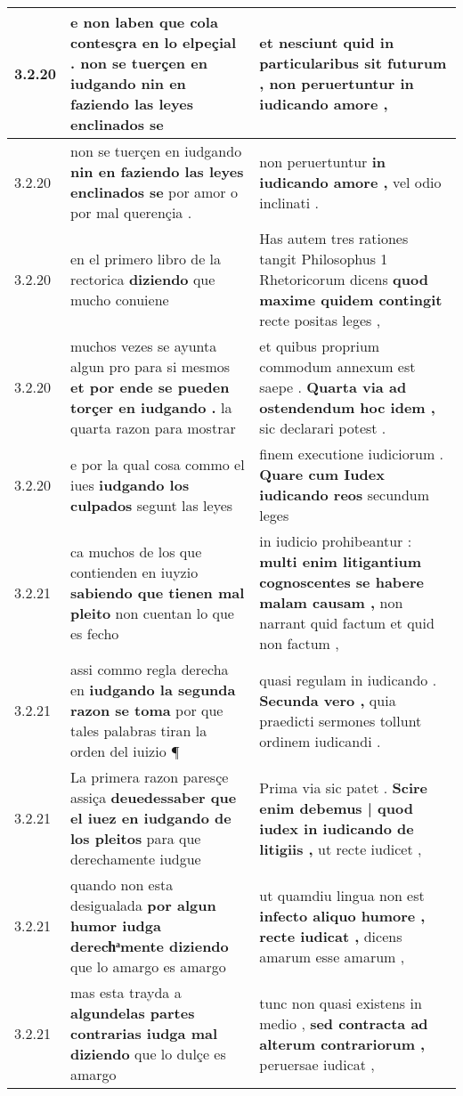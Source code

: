 \begin{tabular}{|p{1cm}|p{6.5cm}|p{6.5cm}|}
3.2.20 & e non laben que cola contesçra en lo elpeçial . \textbf{ non se tuerçen en iudgando } nin en faziendo las leyes enclinados se & et nesciunt quid in particularibus sit futurum , \textbf{ non peruertuntur } in iudicando amore , \\\hline
3.2.20 & non se tuerçen en iudgando \textbf{ nin en faziendo las leyes enclinados se } por amor o por mal querençia . & non peruertuntur \textbf{ in iudicando amore , } vel odio inclinati . \\\hline
3.2.20 & en el primero libro de la rectorica \textbf{ diziendo } que mucho conuiene & Has autem tres rationes tangit Philosophus 1 Rhetoricorum dicens \textbf{ quod maxime quidem contingit } recte positas leges , \\\hline
3.2.20 & muchos vezes se ayunta algun pro para si mesmos \textbf{ et por ende se pueden torçer en iudgando . } la quarta razon para mostrar & et quibus proprium commodum annexum est saepe . \textbf{ Quarta via ad ostendendum hoc idem , } sic declarari potest . \\\hline
3.2.20 & e por la qual cosa commo el iues \textbf{ iudgando los culpados } segunt las leyes & finem executione iudiciorum . \textbf{ Quare cum Iudex iudicando reos } secundum leges \\\hline
3.2.21 & ca muchos de los que contienden en iuyzio \textbf{ sabiendo que tienen mal pleito } non cuentan lo que es fecho & in iudicio prohibeantur : \textbf{ multi enim litigantium cognoscentes se habere malam causam , } non narrant quid factum et quid non factum , \\\hline
3.2.21 & assi commo regla derecha en \textbf{ iudgando la segunda razon se toma } por que tales palabras tiran la orden del iuizio ¶ & quasi regulam in iudicando . \textbf{ Secunda vero , } quia praedicti sermones tollunt ordinem iudicandi . \\\hline
3.2.21 & La primera razon paresçe assiça \textbf{ deuedessaber que el iuez en iudgando de los pleitos } para que derechamente iudgue & Prima via sic patet . \textbf{ Scire enim debemus | quod iudex in iudicando de litigiis , } ut recte iudicet , \\\hline
3.2.21 & quando non esta desigualada \textbf{ por algun humor iudga derechͣmente diziendo } que lo amargo es amargo & ut quamdiu lingua non est \textbf{ infecto aliquo humore , recte iudicat , } dicens amarum esse amarum , \\\hline
3.2.21 & mas esta trayda a \textbf{ algundelas partes contrarias iudga mal diziendo } que lo dulçe es amargo & tunc non quasi existens in medio , \textbf{ sed contracta ad alterum contrariorum , } peruersae iudicat , \\\hline

\end{tabular}
